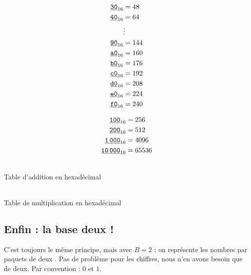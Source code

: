 \begin{minipage}[t]{0.18\linewidth}
\footnotesize{}
\begin{align*}
\underline{\text{\texttt{30}}}_{16} &= 48\\
\underline{\text{\texttt{40}}}_{16} &= 64\\
&\vdots\\
\underline{\text{\texttt{90}}}_{16} &= 144\\
\underline{\text{\texttt{a0}}}_{16} &= 160\\
\underline{\text{\texttt{b0}}}_{16} &= 176\\
\underline{\text{\texttt{c0}}}_{16} &= 192\\
\underline{\text{\texttt{d0}}}_{16} &= 208\\
\underline{\text{\texttt{e0}}}_{16} &= 224\\
\underline{\text{\texttt{f0}}}_{16} &= 240\\
\end{align*}
\end{minipage}
\begin{minipage}[t]{0.18\linewidth}
\footnotesize{}
\begin{align*}
\underline{\text{\texttt{100}}}_{16} &= 256\\
\underline{\text{\texttt{200}}}_{16} &= 512\\
\underline{\text{\texttt{1\,000}}}_{16} &= 4096\\
\underline{\text{\texttt{10\,000}}}_{16} &= 65536\\
\end{align*}
\end{minipage}


\begin{center}
  \tiny{}
  \\
  Table d'addition en hexadécimal
\end{center}

\begin{center}
  \tiny{}
  \\
  Table de multiplication en hexadécimal
\end{center}


\subsection{Enfin : la base deux !}

C'est toujours le même principe, mais avec $B=2$ ; on représente les nombres \og par paquets de deux \fg{}. 
Pas de problème pour les chiffres, nous n'en avons besoin que de deux. Par convention : $0$ et $1$.

